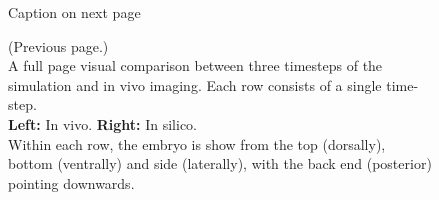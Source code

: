 \newpage

\begin{figure}[H]
    \centering
    \vspace*{-1cm}\hspace*{-1cm}
    \caption{Caption on next page}
    \label{fig:big-visual-comparison}
\end{figure}
\newpage
\addtocounter{figure}{-1}
\begin{figure} [t!]
  \caption{(Previous page.) \\A full page visual comparison between three timesteps of the simulation and in vivo imaging. 
  Each row consists of a single time-step. \\\textbf{Left:} In vivo. \textbf{Right:} In silico.\\Within each row, the embryo is show from the top (dorsally), bottom (ventrally) and side (laterally), with the back end (posterior) pointing downwards.
  }
\end{figure}

